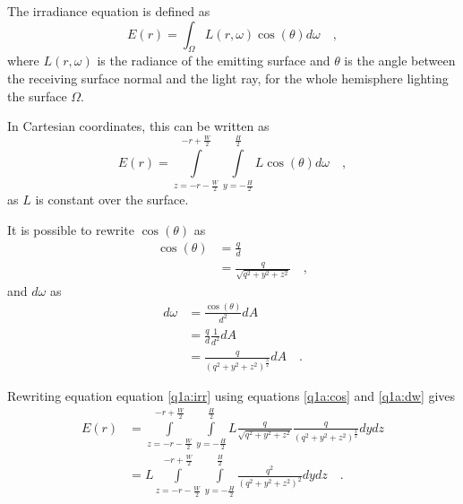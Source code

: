 \documentclass{report}
\begin{document}
The irradiance equation is defined as
\begin{equation}
E(r) = \int_{\Omega} L(r,\omega)\cos(\theta) d\omega
\quad,
\end{equation}
where $L(r,\omega)$ is the radiance of the emitting surface and $\theta$ is the angle between the receiving surface normal and the light ray, for the whole hemisphere lighting the surface $\Omega$.

In Cartesian coordinates, this can be written as
\begin{equation}
E(r) = \int\limits_{z= -r - \frac{W}{2}}^{-r+\frac{W}{2}} \int\limits_{y= - \frac{H}{2}}^{\frac{H}{2}} L \cos(\theta) d\omega
\quad,
\label{q1a:irr}
\end{equation}
as $L$ is constant over the surface.

It is possible to rewrite $\cos(\theta)$ as
\begin{align}
\cos(\theta)  &= \frac{q}{d} \\
              &= \frac{q}{\sqrt{q^2 + y^2 + z^2}}
\quad,
\label{q1a:cos}
\end{align}
and $d\omega$ as
\begin{align}
d\omega &= \frac{\cos(\theta)}{d^2} dA \\
        &= \frac{q}{d} \frac{1}{d^2} dA \\
        &= \frac{q}{\left(q^2 + y^2 + z^2\right)^\frac{3}{2}} dA
\quad.
\label{q1a:dw}
\end{align}

Rewriting equation equation \eqref{q1a:irr} using equations \eqref{q1a:cos} and \eqref{q1a:dw} gives
\begin{align}
E(r) &= \int\limits_{z= -r - \frac{W}{2}}^{-r+\frac{W}{2}} \int\limits_{y= - \frac{H}{2}}^{\frac{H}{2}} L \frac{q}{\sqrt{q^2 + y^2 + z^2}} \frac{q}{\left(q^2 + y^2 + z^2\right)^\frac{3}{2}} dydz \\
     &= L \int\limits_{z= -r - \frac{W}{2}}^{-r+\frac{W}{2}} \int\limits_{y= - \frac{H}{2}}^{\frac{H}{2}} \frac{q^2}{\left(q^2 + y^2 + z^2\right)^2} dydz 
\quad.
\end{align}
\end{document}
